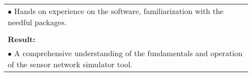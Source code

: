 \begin{table}[!h]
\begin{center}
\begin{tabular}{|p{35mm}||p{55mm}|p{50mm}||p{40mm}|}
      \multicolumn{4}{|p{150mm}|}{$\bullet$ Hands on experience on the software, familiarization with the needful packages.} \\
      \multicolumn{4}{|p{150mm}|}{}                                                                                                                                                                           \\
      \multicolumn{4}{|p{150mm}|}{\textbf{Result:}}                                                                                                                                                       \\
      \multicolumn{4}{|p{150mm}|}{$\bullet$ A comprehensive understanding of the fundamentals and operation of the sensor network simulator tool.}                                                                                                                          \\
      \hline
    \end{tabular}
  \end{center}
\end{table}

\clearpage


